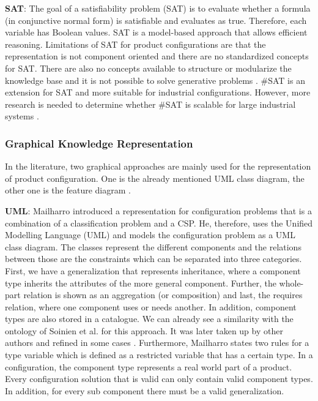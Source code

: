 \textbf{SAT}: The goal of a satisfiability problem (SAT) is to evaluate whether a formula (in conjunctive normal form) is satisfiable and evaluates as true. Therefore, each variable has Boolean values. SAT is a model-based approach that allows efficient reasoning. Limitations of SAT for product configurations are that the representation is not component oriented and there are no standardized concepts for SAT. There are also no concepts available to structure or modularize the knowledge base and it is not possible to solve generative problems \cite{hofestrybawo14a}. \#SAT is an extension for SAT and more suitable for industrial configurations. However, more research is needed to determine whether \#SAT is scalable for large industrial systems \cite{suthsc20a}.
\newpage
\subsubsection{Graphical Knowledge Representation}

In the literature, two graphical approaches are mainly used for the representation of product configuration. One is the already mentioned UML class diagram, the other one is the feature diagram \cite{hofestrybawo14a, mytirafe14a}. \newline

\textbf{UML}: Mailharro \cite{mailharro98a} introduced a representation for configuration problems that is a combination of a classification problem and a CSP. He, therefore, uses the Unified Modelling Language (UML) and models the configuration problem as a UML class diagram. The classes represent the different components and the relations between those are the constraints which can be separated into three categories. First, we have a generalization that represents inheritance, where a component type inherits the attributes of the more general component. Further, the whole-part relation is shown as an aggregation (or composition) and last, the requires relation, where one component uses or needs another. In addition, component types are also stored in a catalogue. We can already see a similarity with the ontology of Soinien et al. \cite{sotimasu98a} for this approach. It was later taken up by other authors and refined in some cases \cite{fefrjastza03a, hofestrybawo14a}. Furthermore, Mailharro \cite{mailharro98a} states two rules for a type variable which is defined as a restricted variable that has a certain type. In a configuration, the component type represents a real world part of a product. Every configuration solution that is valid can only contain valid component types. In addition, for every sub component there must be a valid generalization. \newline

